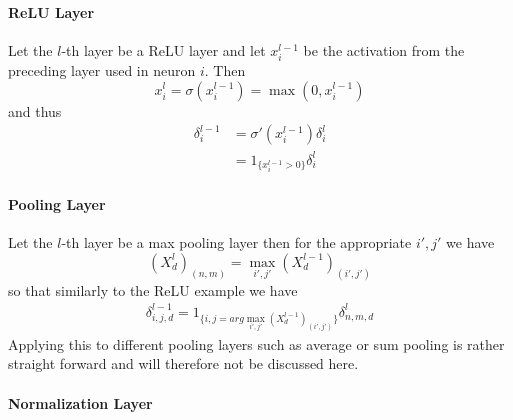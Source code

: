 \documentclass[preprint,12pt,3p]{elsarticle}
\begin{document}
\paragraph{ReLU Layer}
Let the $l$-th layer be a ReLU layer and let $x^{l-1}_i$ be the activation from the preceding layer used in neuron $i$. Then 
$$x^l_i=\sigma(x^{l-1}_i)=\max(0,x^{l-1}_i)$$
and thus 
\begin{align*}
    \delta_i^{l-1}&=\sigma'(x^{l-1}_i)\delta_i^{l}\\
    &=1_{\big\{x^{l-1}_i>0\big\}}\delta_i^{l}
\end{align*}
\paragraph{Pooling Layer}
Let the $l$-th layer be a max pooling layer then for the appropriate $i',j'$ we have $$(X^l_d)_{(n,m)}=\max_{i',j'}(X^{l-1}_d)_{(i',j')}$$
so that similarly to the ReLU example we have
\begin{align*}
    \delta^{l-1}_{i,j,d}=1_{\big\{i,j=arg\max_{i',j'}(X^{l-1}_d)_{(i',j')}\big\}}\delta^{l}_{n,m,d}
\end{align*}
Applying this to different pooling layers such as average or sum pooling is rather straight forward and will therefore not be discussed here.
\paragraph{Normalization Layer}
\end{document}
